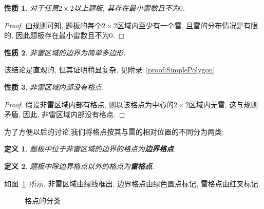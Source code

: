 \documentclass{ctexart}
\newcommand{\varible}[1]{{\Noto[#1]}}
\newcommand{\redcross}[2]{
    \begin{scope}[thick,color = red,shift={(#1,#2)}]
        \draw (0.05,-0.05) -- (-0.05,0.05);
        \draw (-0.05,-0.05) -- (0.05,0.05);
    \end{scope}
}
\newcommand{\greenlinedot}[4]{
    \draw[color = cyan,line width = 1.5] (#1,#2) -- (#3,#4);
    \draw[fill, color = green] (#1,#2) circle (0.03);
    \draw[fill, color = green] (#3,#4) circle (0.03);
    }
\newtheorem{property}{性质}
\newtheorem{definition}{定义}
\begin{document}
\begin{property}
    对于任意$2\times2$以上题板, 其存在最小雷数且不为$0$.
\end{property}
\begin{proof}
    由\varible{Q}规则可知, 题板的每个$2\times2$区域内至少有一个雷, 且雷的分布情况是有限的, 因此题板存在最小雷数且不为$0$.
\end{proof}
\begin{property}
    \label{p2}
    非雷区域的边界为简单多边形.
\end{property}
该结论是直观的, 但其证明稍显复杂, 见附录\ \ref{proof:SimplePolygon}
\begin{property}
    \label{p3}
    非雷区域内部没有格点.
\end{property}
\begin{proof}
    假设非雷区域内部有格点, 则以该格点为中心的$2\times2$区域内无雷, 这与\varible{Q}规则矛盾, 因此, 非雷区域内部没有格点.
\end{proof}
为了方便以后的讨论,我们将格点按其与雷的相对位置的不同分为两类: 
\begin{definition}
    题板中位于非雷区域的边界的格点为\textbf{边界格点}.
\end{definition}
\begin{definition}
    题板中除边界格点以外的格点为\textbf{雷格点}.
\end{definition}
如图\ \ref{gridpoint}\ 所示, 非雷区域由绿线框出, 边界格点由绿色圆点标记, 雷格点由红叉标记.
\begin{figure}[ht]
    \centering
    \caption{格点的分类}
    \label{gridpoint}
\end{figure}
\end{document}
